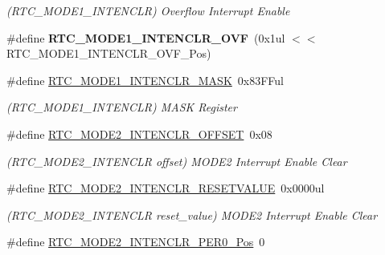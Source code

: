 \begin{DoxyCompactItemize}
\begin{DoxyCompactList}\small\item\em (R\+T\+C\+\_\+\+M\+O\+D\+E1\+\_\+\+I\+N\+T\+E\+N\+C\+L\+R) Overflow Interrupt Enable \end{DoxyCompactList}\item 
\hypertarget{group___s_a_m_l21___r_t_c_ga99347c48a241fb6ea77252742ced9351}{}\#define {\bfseries R\+T\+C\+\_\+\+M\+O\+D\+E1\+\_\+\+I\+N\+T\+E\+N\+C\+L\+R\+\_\+\+O\+V\+F}~(0x1ul $<$$<$ R\+T\+C\+\_\+\+M\+O\+D\+E1\+\_\+\+I\+N\+T\+E\+N\+C\+L\+R\+\_\+\+O\+V\+F\+\_\+\+Pos)\label{group___s_a_m_l21___r_t_c_ga99347c48a241fb6ea77252742ced9351}

\item 
\hypertarget{group___s_a_m_l21___r_t_c_gad7931f30abd7200b9d684a0c53dc1dc6}{}\#define \hyperlink{group___s_a_m_l21___r_t_c_gad7931f30abd7200b9d684a0c53dc1dc6}{R\+T\+C\+\_\+\+M\+O\+D\+E1\+\_\+\+I\+N\+T\+E\+N\+C\+L\+R\+\_\+\+M\+A\+S\+K}~0x83\+F\+Ful\label{group___s_a_m_l21___r_t_c_gad7931f30abd7200b9d684a0c53dc1dc6}

\begin{DoxyCompactList}\small\item\em (R\+T\+C\+\_\+\+M\+O\+D\+E1\+\_\+\+I\+N\+T\+E\+N\+C\+L\+R) M\+A\+S\+K Register \end{DoxyCompactList}\item 
\hypertarget{group___s_a_m_l21___r_t_c_ga678d9705ff5d56582cfb0509133f716f}{}\#define \hyperlink{group___s_a_m_l21___r_t_c_ga678d9705ff5d56582cfb0509133f716f}{R\+T\+C\+\_\+\+M\+O\+D\+E2\+\_\+\+I\+N\+T\+E\+N\+C\+L\+R\+\_\+\+O\+F\+F\+S\+E\+T}~0x08\label{group___s_a_m_l21___r_t_c_ga678d9705ff5d56582cfb0509133f716f}

\begin{DoxyCompactList}\small\item\em (R\+T\+C\+\_\+\+M\+O\+D\+E2\+\_\+\+I\+N\+T\+E\+N\+C\+L\+R offset) M\+O\+D\+E2 Interrupt Enable Clear \end{DoxyCompactList}\item 
\hypertarget{group___s_a_m_l21___r_t_c_ga4369d71fe3da5dec1b13a8df4ba27687}{}\#define \hyperlink{group___s_a_m_l21___r_t_c_ga4369d71fe3da5dec1b13a8df4ba27687}{R\+T\+C\+\_\+\+M\+O\+D\+E2\+\_\+\+I\+N\+T\+E\+N\+C\+L\+R\+\_\+\+R\+E\+S\+E\+T\+V\+A\+L\+U\+E}~0x0000ul\label{group___s_a_m_l21___r_t_c_ga4369d71fe3da5dec1b13a8df4ba27687}

\begin{DoxyCompactList}\small\item\em (R\+T\+C\+\_\+\+M\+O\+D\+E2\+\_\+\+I\+N\+T\+E\+N\+C\+L\+R reset\+\_\+value) M\+O\+D\+E2 Interrupt Enable Clear \end{DoxyCompactList}\item 
\hypertarget{group___s_a_m_l21___r_t_c_ga20f97a744c4263d2f9b77816c200f470}{}\#define \hyperlink{group___s_a_m_l21___r_t_c_ga20f97a744c4263d2f9b77816c200f470}{R\+T\+C\+\_\+\+M\+O\+D\+E2\+\_\+\+I\+N\+T\+E\+N\+C\+L\+R\+\_\+\+P\+E\+R0\+\_\+\+Pos}~0\label{group___s_a_m_l21___r_t_c_ga20f97a744c4263d2f9b77816c200f470}


\end{DoxyCompactItemize}
